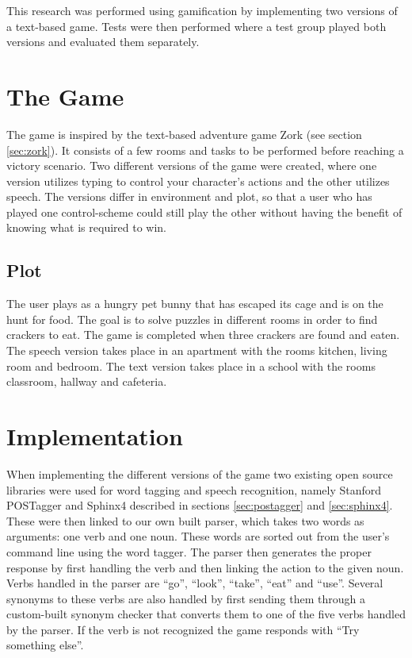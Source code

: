 This research was performed using gamification by implementing two versions of a text-based game. Tests were then performed where a test group played both versions and evaluated them separately. 

\section{The Game}
The game is inspired by the text-based adventure game Zork (see section \ref{sec:zork}). It consists of a few rooms and tasks to be performed before reaching a victory scenario. Two different versions of the game were created, where one version utilizes typing to control your character’s actions and the other utilizes speech. The versions differ in environment and plot, so that a user who has played one control-scheme could still play the other without having the benefit of knowing what is required to win.

\subsection{Plot}
The user plays as a hungry pet bunny that has escaped its cage and is on the hunt for food. The goal is to solve puzzles in different rooms in order to find crackers to eat. The game is completed when three crackers are found and eaten. The speech version takes place in an apartment with the rooms kitchen, living room and bedroom. The text version takes place in a school with the rooms classroom, hallway and cafeteria.

\section{Implementation}
When implementing the different versions of the game two existing open source libraries were used for word tagging and speech recognition, namely Stanford POSTagger and Sphinx4 described in sections \ref{sec:postagger} and \ref{sec:sphinx4}. These were then linked to our own built parser, which takes two words as arguments: one verb and one noun. These words are sorted out from the user's command line using the word tagger. The parser then generates the proper response by first handling the verb and then linking the action to the given noun. Verbs handled in the parser are ``go'', ``look'', ``take'', ``eat'' and ``use''. Several synonyms to these verbs are also handled by first sending them through a custom-built synonym checker that converts them to one of the five verbs handled by the parser. If the verb is not recognized the game responds with ``Try something else''.


